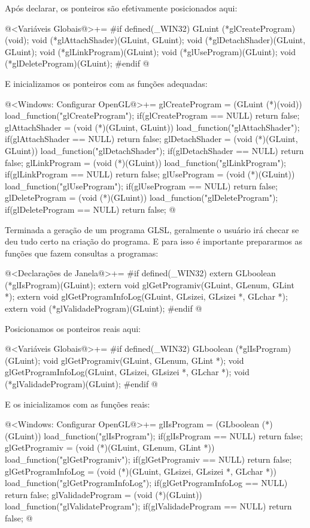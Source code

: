 Após declarar, os ponteiros são efetivamente posicionados aqui:

\iniciocodigo
@<Variáveis Globais@>+=
#if defined(_WIN32)
GLuint (*glCreateProgram)(void);
void (*glAttachShader)(GLuint, GLuint);
void (*glDetachShader)(GLuint, GLuint);
void (*glLinkProgram)(GLuint);
void (*glUseProgram)(GLuint);
void (*glDeleteProgram)(GLuint);
#endif
@
\fimcodigo

E inicializamos os ponteiros com as funções adequadas:

\iniciocodigo
@<Windows: Configurar OpenGL@>+=
glCreateProgram = (GLuint (*)(void)) load_function("glCreateProgram");
if(glCreateProgram == NULL) return false;
glAttachShader = (void (*)(GLuint, GLuint)) load_function("glAttachShader");
if(glAttachShader == NULL) return false;
glDetachShader = (void (*)(GLuint, GLuint)) load_function("glDetachShader");
if(glDetachShader == NULL) return false;
glLinkProgram = (void (*)(GLuint)) load_function("glLinkProgram");
if(glLinkProgram == NULL) return false;
glUseProgram = (void (*)(GLuint)) load_function("glUseProgram");
if(glUseProgram == NULL) return false;
glDeleteProgram = (void (*)(GLuint)) load_function("glDeleteProgram");
if(glDeleteProgram == NULL) return false;
@
\fimcodigo

Terminada a geração de um programa GLSL, geralmente o usuário irá
checar se deu tudo certo na criação do programa. E para isso é
importante prepararmos as funções que fazem consultas a programas:

\iniciocodigo
@<Declarações de Janela@>+=
#if defined(_WIN32)
extern GLboolean (*glIsProgram)(GLuint);
extern void glGetProgramiv(GLuint, GLenum, GLint *);
extern void glGetProgramInfoLog(GLuint, GLsizei, GLsizei *, GLchar *);
extern void (*glValidadeProgram)(GLuint);
#endif
@
\fimcodigo

Posicionamos os ponteiros reais aqui:

\iniciocodigo
@<Variáveis Globais@>+=
#if defined(_WIN32)
GLboolean (*glIsProgram)(GLuint);
void glGetProgramiv(GLuint, GLenum, GLint *);
void glGetProgramInfoLog(GLuint, GLsizei, GLsizei *, GLchar *);
void (*glValidadeProgram)(GLuint);
#endif
@
\fimcodigo

E os inicializamos com as funções reais:

\iniciocodigo
@<Windows: Configurar OpenGL@>+=
glIsProgram = (GLboolean (*)(GLuint)) load_function("glIsProgram");
if(glIsProgram == NULL) return false;
glGetProgramiv = (void (*)(GLuint, GLenum, GLint *))
                    load_function("glGetProgramiv");
if(glGetProgramiv == NULL) return false;
glGetProgramInfoLog = (void (*)(GLuint, GLsizei, GLsizei *, GLchar *))
                          load_function("glGetProgramInfoLog");
if(glGetProgramInfoLog == NULL) return false;
glValidadeProgram = (void (*)(GLuint)) load_function("glValidateProgram");
if(glValidadeProgram == NULL) return false;
@
\fimcodigo

